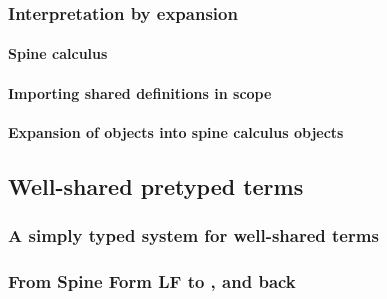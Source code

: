 \documentclass[preprint,9pt,authoryear]{sigplanconf}
\begin{document}



\subsubsection{Interpretation by expansion}

\paragraph{Spine calculus}


\paragraph{Importing shared definitions in scope}


\paragraph{Expansion of {\system} objects into spine calculus objects}



\subsection{Well-shared pretyped terms}

\subsubsection{A simply typed system for well-shared terms}


\subsubsection{From Spine Form LF to {\system}, and back}



\end{document}
